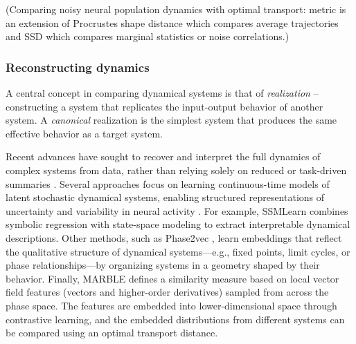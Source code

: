 \documentclass{article}
\newcommand{\ascomment}[1]{\textcolor{ascolor}{(#1)}}
\theoremstyle{definition} \newtheorem{definition}{Definition}  \newtheorem{example}{Example}
\theoremstyle{remark} \newtheorem{remark}{Remark}
\newcounter{ct}
\begin{document}
\ascomment{Comparing noisy neural population dynamics with optimal transport: metric is an extension of Procrustes shape distance which compares average trajectories and SSD which compares marginal statistics or noise correlations\citep{nejatbakhsh2024comparing, lipshutz2024disentangling}.}








\subsubsection{Reconstructing dynamics}\label{sec:reconstruction}
A central concept in comparing dynamical systems is that of \emph{realization} -- constructing a system that replicates the input-output behavior of another system\citep{grigoryeva2020dimension, gonon2023approximation}.
A \emph{canonical} realization is the simplest system that produces the same effective behavior as a target system.


Recent advances have sought to recover and interpret the full dynamics of complex systems from data, rather than relying solely on reduced or task-driven summaries \citep{durstewitz2023reconstructing, brenner2024almost}.
Several approaches focus on learning continuous-time models of latent stochastic dynamical systems, enabling structured representations of uncertainty and variability in neural activity \citep{duncker2019learning}.
For example, SSMLearn \citep{cenedese2022data} combines symbolic regression with state-space modeling to extract interpretable dynamical descriptions.
Other methods, such as Phase2vec \citep{ricci2022phase2vec}, learn embeddings that reflect the qualitative structure of dynamical systems—e.g., fixed points, limit cycles, or phase relationships—by organizing systems in a geometry shaped by their behavior.
Finally, MARBLE defines a similarity measure based on local vector field features (vectors and higher-order derivatives) sampled from across the phase space.
The features are embedded into lower-dimensional space through contrastive learning, and the embedded distributions from different systems can be compared using an optimal transport distance\citep{gosztolai2025marble}.
\end{document}
